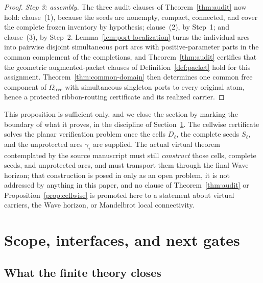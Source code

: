 \documentclass[11pt,reqno]{amsart}
\theoremstyle{definition}
\theoremstyle{remark}
\newcommand{\Omfree}{\Omega_{\mathrm{free}}}
\begin{document}
\begin{proof}
\emph{Step 3: assembly.}
The three audit clauses of Theorem~\ref{thm:audit} now hold: clause~(1), because the
seeds are nonempty, compact, connected, and cover the complete frozen inventory by hypothesis;
clause~(2), by Step~1; and clause~(3), by Step~2. Lemma~\ref{lem:port-localization}
turns the individual arcs into pairwise disjoint simultaneous port arcs with
positive-parameter parts in the common complement of the completions, and
Theorem~\ref{thm:audit} certifies that the geometric augmented-packet clauses of
Definition~\ref{def:packet} hold for this assignment. Theorem~\ref{thm:common-domain}
then determines one common free component of $\Omfree$ with simultaneous singleton
ports to every original atom, hence a protected ribbon-routing certificate
and its realized carrier.
\end{proof}

This proposition is sufficient only, and we close the section by marking the
boundary of what it proves, in the discipline of Section~\ref{sec:scope}. The
cellwise certificate solves the planar verification problem once the cells
$D_\ell$, the complete seeds $S_\ell$, and the unprotected arcs $\gamma_i$ are
supplied. The actual virtual theorem contemplated by the source manuscript must
still \emph{construct} those cells, complete seeds, and unprotected arcs, and must
transport them through the final Wave horizon; that construction is posed in
\cite{MWman} only as an open problem, it is not addressed by anything in this paper,
and no clause of Theorem~\ref{thm:audit} or Proposition~\ref{prop:cellwise} is
promoted here to a statement about virtual carriers, the Wave horizon, or Mandelbrot
local connectivity.

\section{Scope, interfaces, and next gates}
\label{sec:scope}

\subsection{What the finite theory closes}
\end{document}
